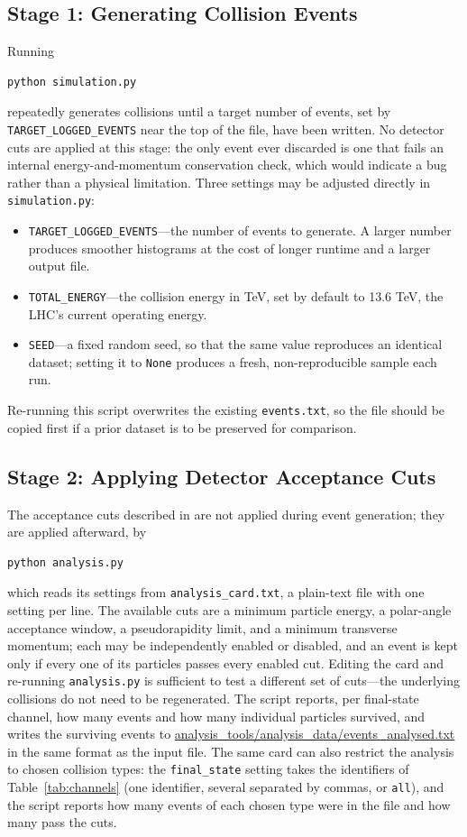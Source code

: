 \documentclass{article}
\begin{document}
\subsection{Stage 1: Generating Collision Events}
\label{ssec:running_stage1}
Running
\begin{verbatim}
python simulation.py
\end{verbatim}
repeatedly generates collisions until a target number of events, set by \texttt{TARGET\_LOGGED\_EVENTS} near the top of the file, have been written. No detector cuts are applied at this stage: the only event ever discarded is one that fails an internal energy-and-momentum conservation check, which would indicate a bug rather than a physical limitation. Three settings may be adjusted directly in \texttt{simulation.py}:
\begin{itemize}
    \item \texttt{TARGET\_LOGGED\_EVENTS}---the number of events to generate. A larger number produces smoother histograms at the cost of longer runtime and a larger output file.
    \item \texttt{TOTAL\_ENERGY}---the collision energy in TeV, set by default to 13.6 TeV, the LHC's current operating energy.
    \item \texttt{SEED}---a fixed random seed, so that the same value reproduces an identical dataset; setting it to \texttt{None} produces a fresh, non-reproducible sample each run.
\end{itemize}
Re-running this script overwrites the existing \texttt{events.txt}, so the file should be copied first if a prior dataset is to be preserved for comparison.

\subsection{Stage 2: Applying Detector Acceptance Cuts}
\label{ssec:running_stage2}
The acceptance cuts described in  are not applied during event generation; they are applied afterward, by
\begin{verbatim}
python analysis.py
\end{verbatim}
which reads its settings from \texttt{analysis\_card.txt}, a plain-text file with one setting per line. The available cuts are a minimum particle energy, a polar-angle acceptance window, a pseudorapidity limit, and a minimum transverse momentum; each may be independently enabled or disabled, and an event is kept only if every one of its particles passes every enabled cut. Editing the card and re-running \texttt{analysis.py} is sufficient to test a different set of cuts---the underlying collisions do not need to be regenerated. The script reports, per final-state channel, how many events and how many individual particles survived, and writes the surviving events to \url{analysis_tools/analysis_data/events_analysed.txt} in the same format as the input file. The same card can also restrict the analysis to chosen collision types: the \texttt{final\_state} setting takes the identifiers of Table~\ref{tab:channels} (one identifier, several separated by commas, or \texttt{all}), and the script reports how many events of each chosen type were in the file and how many pass the cuts.
\end{document}

